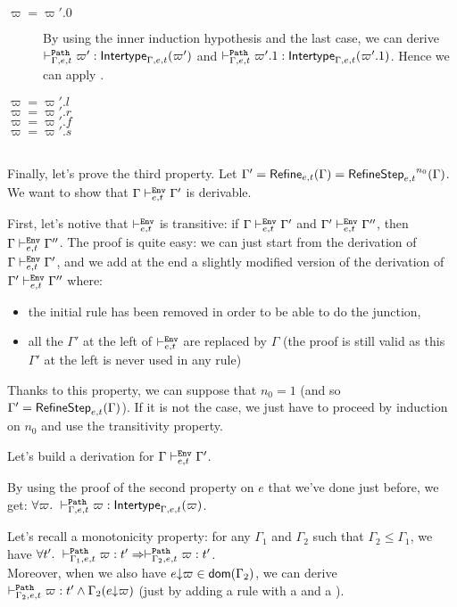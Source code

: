 \documentclass[a4paper]{article}
\theoremstyle{definition}
\begin{document}
\begin{description}
    \item[$\varpi=\varpi'.0$] By using the inner induction hypothesis and the last case, we can derive
    $\vdash^{\texttt{Path}}_{\Gamma,e,t} \varpi' : \textsf{Intertype}_{\Gamma,e,t} (\varpi')$ and $\vdash^{\texttt{Path}}_{\Gamma,e,t} \varpi'.1 : \textsf{Intertype}_{\Gamma,e,t} (\varpi'.1)$.
    Hence we can apply .
    \item[$\varpi=\varpi'.l$]
    \item[$\varpi=\varpi'.r$]
    \item[$\varpi=\varpi'.f$]
    \item[$\varpi=\varpi'.s$]    
  \end{description}\ \\

  Finally, let's prove the third property.
  Let $\Gamma' = \textsf{Refine}_{e,t}(\Gamma) = {\textsf{RefineStep}_{e,t}}^{n_0}(\Gamma)$.
  We want to show that $\Gamma \vdash^{\texttt{Env}}_{e,t} \Gamma'$ is derivable.

  First, let's notive that $\vdash^{\texttt{Env}}_{e,t}$ is transitive:
  if $\Gamma \vdash^{\texttt{Env}}_{e,t} \Gamma'$ and $\Gamma' \vdash^{\texttt{Env}}_{e,t} \Gamma''$, then $\Gamma \vdash^{\texttt{Env}}_{e,t} \Gamma''$.
  The proof is quite easy: we can just start from the derivation of $\Gamma \vdash^{\texttt{Env}}_{e,t} \Gamma'$, and we add
  at the end a slightly modified version of the derivation of $\Gamma' \vdash^{\texttt{Env}}_{e,t} \Gamma''$ where:
  \begin{itemize}
    \item the initial  rule has been removed in order to be able to do the junction,
    \item all the $\Gamma'$ at the left of $\vdash^{\texttt{Env}}_{e,t}$ are replaced by $\Gamma$
    (the proof is still valid as this $\Gamma'$ at the left is never used in any rule)
  \end{itemize}

  Thanks to this property, we can suppose that $n_0 = 1$ (and so $\Gamma' = \textsf{RefineStep}_{e,t}(\Gamma)$).
  If it is not the case, we just have to proceed by induction on $n_0$ and use the transitivity property.

  Let's build a derivation for $\Gamma \vdash^{\texttt{Env}}_{e,t} \Gamma'$.

  By using the proof of the second property on $e$ that we've done just before, we get:
  $\forall \varpi.\ \vdash^{\texttt{Path}}_{\Gamma,e,t} \varpi: \textsf{Intertype}_{\Gamma,e,t} (\varpi)$.

  Let's recall a monotonicity property: for any $\Gamma_1$ and $\Gamma_2$ such that $\Gamma_2 \leq \Gamma_1$, we have
  $\forall t'.\ \vdash^{\texttt{Path}}_{\Gamma_1,e,t} \varpi:t' \Rightarrow \vdash^{\texttt{Path}}_{\Gamma_2,e,t} \varpi:t'$.\\  
  Moreover, when we also have $e{\downarrow}\varpi \in\textsf{dom}(\Gamma_2)$, we can derive $\vdash^{\texttt{Path}}_{\Gamma_2,e,t} \varpi:t'\land\Gamma_2(e{\downarrow}\varpi)$
  (just by adding a  rule with a  and a ).
\end{document}
